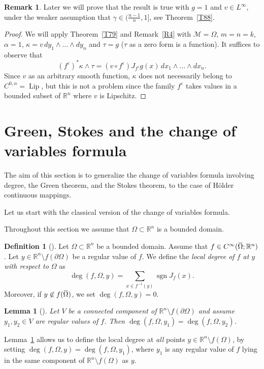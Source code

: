 \documentclass[intlimits,12pt,reqno]{amsart}
\newcommand{\cM}{\mathcal M}
\def\sgn{\operatorname{sgn}}
\newcommand{\R}{\mathbb R}
\newcommand{\overbar}[1]{\mkern 1.7mu\overline{\mkern-1.7mu#1\mkern-1.5mu}\mkern 1.5mu}
\newcommand{\eps}{\varepsilon}
\numberwithin{equation}{section}
\def\deg{\operatorname{deg}}
\def\lip{\operatorname{Lip}}
\newtheorem{lemma}[theorem]{Lemma}
\theoremstyle{definition}
\newtheorem{remark}[theorem]{Remark}
\newtheorem{definition}[theorem]{Definition}
\begin{document}
\begin{remark}
Later we will prove that the result is true with $g=1$ and $v\in L^{\infty}$, under the weaker assumption that $\gamma\in\big(\frac{n-1}{n},1\big]$, see Theorem~\ref{T88}.
\end{remark}
\begin{proof}
We will apply Theorem~\ref{T79} and Remark~\ref{R4} with 
$\cM=\Omega$, $m=n=k$, $\alpha=1$, $\kappa=v\,dy_1\wedge\ldots\wedge dy_n$ and $\tau=g$ ($\tau$ as a zero form is a function).
It suffices to observe that
$$
(f^\eps)^*\kappa\wedge\tau=
(v\circ f^\eps)J_{f^\eps}g(x)\, dx_1\wedge\ldots\wedge dx_n.
$$
Since $v$ as an arbitrary smooth function, $\kappa$ does not necessarily belong to $C^{0,\alpha}=\lip$, but this is not a problem since the family $f^\eps$ takes values in a bounded subset of $\R^n$ where $v$ is Lipschitz.
\end{proof}




\section{Green, Stokes and the change of variables formula}
\label{GSC}

The aim of this section is to generalize the change of variables formula involving degree, 
the Green theorem, and the Stokes theorem, to the case of H\"older continuous mappings. 

Let us start with the classical version of the change of variables formula.

Throughout this section we assume that $\Omega\subset\R^n$ is a bounded domain.
\begin{definition}[\mbox{\cite[Definition 1.2]{FG}}] 
\label{defn12}
Let $\Omega\subset\R^n$ be a bounded domain. Assume that $f\in C^\infty(\overbar{\Omega};\R^n)$. Let $y\in \R^n\setminus f(\partial\Omega)$ be a regular value of $f$. We define the \emph{local degree of $f$ at $y$ with respect to $\Omega$} as
$$
\deg(f,\Omega,y)=\sum_{x\in f^{-1}(y)} \sgn J_f(x).
$$
Moreover, if $y\not \in f(\overbar{\Omega})$, we set $\deg(f,\Omega,y)=0$.
\end{definition}
\begin{lemma}[\mbox{\cite[Proposition 1.8]{FG}}]
\label{prop18}
Let $V$ be a connected component of $\R^n\setminus f(\partial\Omega)$ and assume $y_1,y_2\in V$ are regular values of $f$. Then $\deg(f,\Omega,y_1)=\deg(f,\Omega,y_2)$.
\end{lemma}
Lemma~\ref{prop18} allows us to define the local degree at {\em all} points $y\in\R^n\setminus f(\Omega)$, by setting $\deg(f,\Omega,y)=\deg(f,\Omega,y_1)$,
where $y_1$ is any regular value of $f$ lying in the same component of $\R^n\setminus f(\Omega)$ as $y$.
\end{document}
